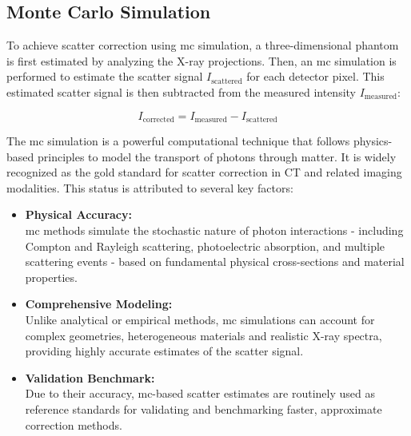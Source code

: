 \subsection{Monte Carlo Simulation}

To achieve scatter correction using \ac{mc} simulation, a three-dimensional
phantom is first estimated by analyzing the X-ray projections. Then, an
\ac{mc} simulation is performed to estimate the scatter signal
$I_\text{scattered}$ for each detector pixel. This estimated scatter signal is
then subtracted from the measured intensity $I_\text{measured}$:

\begin{equation}
    \label{eq:scatter_correction}
    I_{\text{corrected}} = I_\text{measured} - I_\text{scattered}
\end{equation}

The \ac{mc} simulation is a powerful computational technique that follows
physics-based principles to model the transport of photons through matter. It is
widely recognized as the gold standard for scatter correction in CT and related
imaging modalities. This status is attributed to several key factors:

\begin{itemize}
    \item \textbf{Physical Accuracy:} \\
        \ac{mc} methods simulate the stochastic nature of photon interactions -
        including Compton and Rayleigh scattering, photoelectric absorption, and
        multiple scattering events - based on fundamental physical
        cross-sections and material properties.

    \item \textbf{Comprehensive Modeling:} \\
        Unlike analytical or empirical methods, \ac{mc} simulations can account
        for complex geometries, heterogeneous materials and realistic X-ray
        spectra, providing highly accurate estimates of the scatter signal.

    \item \textbf{Validation Benchmark:} \\
        Due to their accuracy, \ac{mc}-based scatter estimates are routinely
        used as reference standards for validating and benchmarking faster,
        approximate correction methods.
\end{itemize}


